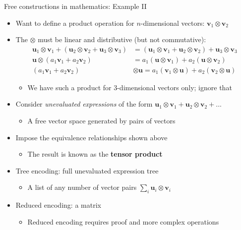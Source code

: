 \documentclass[english,,russian]{beamer}
\begin{document}
\begin{frame}{Free constructions in mathematics: Example II}
\begin{itemize}
\item Want to define a product operation for $n$-dimensional vectors: $\mathbf{v}_{1}\otimes\mathbf{v}_{2}$
\item The $\otimes$ must be linear and distributive (but not commutative):
\begin{align*}
\mathbf{u}_{1}\otimes\mathbf{v}_{1}+\left(\mathbf{u}_{2}\otimes\mathbf{v}_{2}+\mathbf{u}_{3}\otimes\mathbf{v}_{3}\right) & =\left(\mathbf{u}_{1}\otimes\mathbf{v}_{1}+\mathbf{u}_{2}\otimes\mathbf{v}_{2}\right)+\mathbf{u}_{3}\otimes\mathbf{v}_{3}\\
\mathbf{u}\otimes\left(a_{1}\mathbf{v}_{1}+a_{2}\mathbf{v}_{2}\right) & =a_{1}\left(\mathbf{u}\otimes\mathbf{v}_{1}\right)+a_{2}\left(\mathbf{u}\otimes\mathbf{v}_{2}\right)\\
\left(a_{1}\mathbf{v}_{1}+a_{2}\mathbf{v}_{2}\right) & \otimes\mathbf{u}=a_{1}\left(\mathbf{v}_{1}\otimes\mathbf{u}\right)+a_{2}\left(\mathbf{v}_{2}\otimes\mathbf{u}\right)
\end{align*}

\begin{itemize}
\item We have such a product for 3-dimensional vectors only; ignore that
\end{itemize}
\item Consider \emph{unevaluated} \emph{expressions} of the form $\mathbf{u}_{1}\otimes\mathbf{v}_{1}+\mathbf{u}_{2}\otimes\mathbf{v}_{2}+...$
\begin{itemize}
\item A free vector space generated by pairs of vectors
\end{itemize}
\item Impose the equivalence relationships shown above
\begin{itemize}
\item The result is known as the \textbf{tensor product}
\end{itemize}
\item Tree encoding: full unevaluated expression tree
\begin{itemize}
\item A list of any number of vector pairs $\sum_{i}\mathbf{u}_{i}\otimes\mathbf{v}_{i}$
\end{itemize}
\item Reduced encoding: a matrix
\begin{itemize}
\item Reduced encoding requires proof and more complex operations
\end{itemize}
\end{itemize}
\end{frame}
\end{document}
